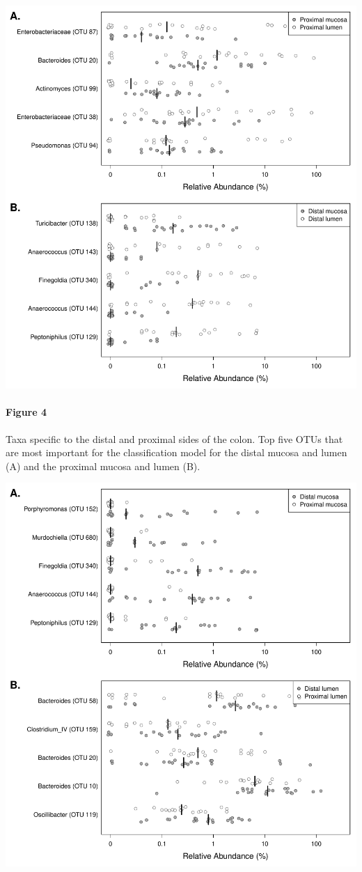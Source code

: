 \documentclass[11pt,]{article}
\let\oldparagraph\paragraph
\renewcommand{\paragraph}[1]{\oldparagraph{#1}\mbox{}}
\begin{document}
\includegraphics{../submission/figure_4.pdf}

\paragraph{Figure 4}\label{figure-4}

Taxa specific to the distal and proximal sides of the colon. Top five
OTUs that are most important for the classification model for the distal
mucosa and lumen (A) and the proximal mucosa and lumen (B).

\newpage

\includegraphics{../submission/figure_5.pdf}
\end{document}
